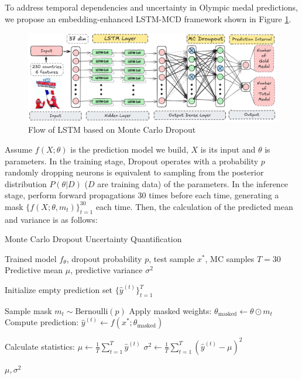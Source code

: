 \documentclass{mcmthesis}
\begin{document}
To address temporal dependencies and uncertainty in Olympic medal predictions, we propose an embedding-enhanced LSTM-MCD framework shown in Figure \ref{fig:LSTM-MCD}. 
	\begin{figure}[H]
	\centering
	\includegraphics[width=1\linewidth]{fig/LSTM-MCD.png}
	\caption{Flow of LSTM based on Monte Carlo Dropout}
	\label{fig:LSTM-MCD}
\end{figure}
  Assume $f(X;\theta)$ is the prediction model we build, $X$ is its input and $\theta$ is parameters. In the training stage, Dropout operates with a probability $p$
randomly dropping neurons is equivalent to sampling from the posterior distribution $P(\theta|D)$ ($D$ are training data) of the parameters. In the inference stage, perform forward propagations $30$ times before each time, generating a mask $\{f(X;\theta,m_t)\}_{t=1}^{30}$ each time. Then, the calculation of the predicted mean and variance is as follows:
\begin{algorithm}
	\caption{Monte Carlo Dropout Uncertainty Quantification}
	\begin{algorithmic}[1]
		\Require Trained model $f_\theta$, dropout probability $p$, test sample $x^*$, MC samples $T=30$
		\Ensure Predictive mean $\mu$, predictive variance $\sigma^2$
		
		\State Initialize empty prediction set $\{\hat{y}^{(t)}\}_{t=1}^T$
		
		\State Sample mask $m_t \sim \text{Bernoulli}(p)$ 
		\State Apply masked weights: $\theta_{\text{masked}} \gets \theta \odot m_t$
		\State Compute prediction: $\hat{y}^{(t)} \gets f(x^*; \theta_{\text{masked}})$
		\EndFor
		
		\State Calculate statistics:
		\State $\mu \gets \frac{1}{T}\sum_{t=1}^T \hat{y}^{(t)}$ 
		\State $\sigma^2 \gets \frac{1}{T}\sum_{t=1}^T (\hat{y}^{(t)} - \mu)^2$ 
		\EndFor
		
		\State \Return $\mu, \sigma^2$
	\end{algorithmic}
\end{algorithm}
\end{document}
